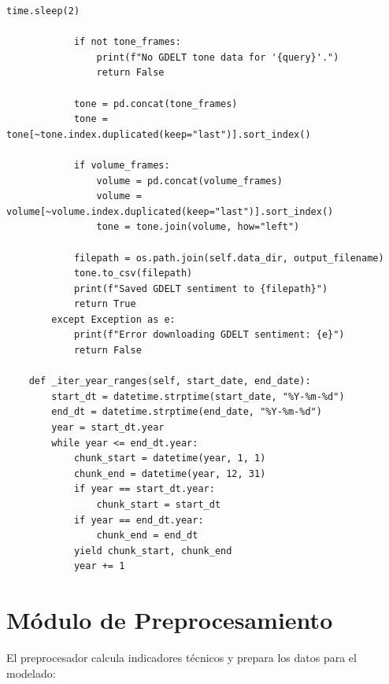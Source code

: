 \begin{lstlisting}[frame=single, caption={Descargador de datos financieros}]
                time.sleep(2)

            if not tone_frames:
                print(f"No GDELT tone data for '{query}'.")
                return False

            tone = pd.concat(tone_frames)
            tone = tone[~tone.index.duplicated(keep="last")].sort_index()

            if volume_frames:
                volume = pd.concat(volume_frames)
                volume = volume[~volume.index.duplicated(keep="last")].sort_index()
                tone = tone.join(volume, how="left")

            filepath = os.path.join(self.data_dir, output_filename)
            tone.to_csv(filepath)
            print(f"Saved GDELT sentiment to {filepath}")
            return True
        except Exception as e:
            print(f"Error downloading GDELT sentiment: {e}")
            return False

    def _iter_year_ranges(self, start_date, end_date):
        start_dt = datetime.strptime(start_date, "%Y-%m-%d")
        end_dt = datetime.strptime(end_date, "%Y-%m-%d")
        year = start_dt.year
        while year <= end_dt.year:
            chunk_start = datetime(year, 1, 1)
            chunk_end = datetime(year, 12, 31)
            if year == start_dt.year:
                chunk_start = start_dt
            if year == end_dt.year:
                chunk_end = end_dt
            yield chunk_start, chunk_end
            year += 1
\end{lstlisting}

\section{Módulo de Preprocesamiento}

El preprocesador calcula indicadores técnicos y prepara los datos para el modelado:

